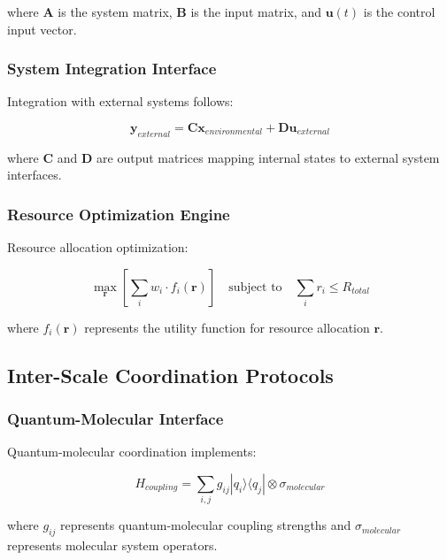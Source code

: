 where $\mathbf{A}$ is the system matrix, $\mathbf{B}$ is the input matrix, and $\mathbf{u}(t)$ is the control input vector.

\subsubsection{System Integration Interface}

Integration with external systems follows:

\begin{equation}
\mathbf{y}_{external} = \mathbf{C} \mathbf{x}_{environmental} + \mathbf{D} \mathbf{u}_{external}
\end{equation}

where $\mathbf{C}$ and $\mathbf{D}$ are output matrices mapping internal states to external system interfaces.

\subsubsection{Resource Optimization Engine}

Resource allocation optimization:

\begin{equation}
\max_{\mathbf{r}} \left[ \sum_i w_i \cdot f_i(\mathbf{r}) \right] \quad \text{subject to} \quad \sum_i r_i \leq R_{total}
\end{equation}

where $f_i(\mathbf{r})$ represents the utility function for resource allocation $\mathbf{r}$.

\subsection{Inter-Scale Coordination Protocols}

\subsubsection{Quantum-Molecular Interface}

Quantum-molecular coordination implements:

\begin{equation}
H_{coupling} = \sum_{i,j} g_{ij} |q_i\rangle\langle q_j| \otimes \sigma_{molecular}
\end{equation}

where $g_{ij}$ represents quantum-molecular coupling strengths and $\sigma_{molecular}$ represents molecular system operators.

